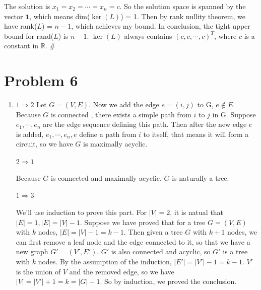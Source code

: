 \documentclass[twoside,11pt]{homework}
\begin{document}
\begin{enumerate}
    The solution is $x_1=x_2=\cdots =x_n=c$. So the solution space is spanned by the vector $\textbf{1}$, which means dim($\ker (L)$) = 1. Then by rank nullity theorem, we have rank($L$) = $n-1$, which achieves my bound.
    \newline\newline
    In conclusion, the tight upper bound for rand($L$) is $n-1$. $\ker (L)$ always contains $(c,c,\cdots,c)^T$, where $c$ is a constant in $\mathbb{R}$. \#
    
\end{enumerate}


\section*{Problem 6}
\begin{enumerate}
    \item 
    $1 \Rightarrow 2$
    Let $G = (V,E)$. Now we add the edge $e=(i,j)$ to G, $e \notin E$.
    Because $G$ is connected , there exists a simple path from $i$ to $j$ in G. Suppose $e_1, \cdots,e_n$ are the edge sequence defining this path. Then after the new edge $e$ is added, $e_1,\cdots,e_n,e$ define a path from $i$ to itself, that means it will form a circuit, so we have $G$ is maximally acyclic.
    
    \paragraph{$2 \Rightarrow 1$}Because $G$ is connected and maximally acyclic, $G$ is naturally a tree.
    
    \paragraph{$1 \Rightarrow 3$}We'll use induction to prove this part.
    \newline
    For $|V|=2$, it is natual that $|E|=1, |E| = |V|-1$. 
    \newline
    Suppose we have proved that for a tree $G = (V,E)$ with $k$ nodes, $|E| = |V| - 1 = k-1$. Then given a tree $G$ with $k+1$ nodes, we can first remove a leaf node and the edge connected to it, so that we have a new graph $G' = (V', E')$. $G' $ is also connected and acyclic, so $G'$ is a tree with $k$ nodes. By the assumption of the induction, $|E'| = |V'| - 1 = k-1$. $V'$ is the union of $V$ and the removed edge, so we have $|V| = |V'| +1 = k = |G|-1$.
    \newline
    So by induction, we proved the conclusion.
    

\end{enumerate}
\end{document}
